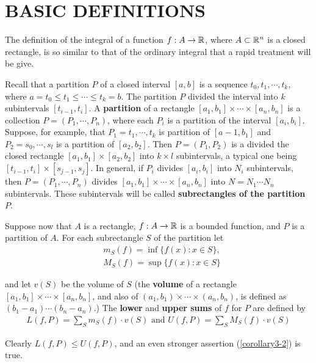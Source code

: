 \section{BASIC DEFINITIONS}
The definition of the integral of a function $f: A\to \mathbb{R}$, where $A\subset \mathbb{R}^n$
is a closed rectangle, is so similar to that of the ordinary integral that 
a rapid treatment will be give.

Recall that a partition $P$ of a closed interval $[a,b]$ is a
sequence $t_0, t_1, \cdots, t_k$, where $a=t_0\le t_1 \le \cdots \le t_k=b$.
The partition $P$ divided the interval into $k$ subintervals $[t_{i-1}, t_i]$.
A \textbf{partition} of a rectangle $[a_1, b_1]\times \cdots \times [a_n, b_n]$
is a collection $P=(P_1, \cdots, P_n)$, where each $P_i$ is a partition of the interval 
$[a_i, b_i]$. Suppose, for example, that $P_1=t_1,\cdots, t_k$ is partition of 
$[a-1, b_1]$ and $P_2=s_0, \cdots, s_l$ is a partition of $[a_2, b_2]$. Then 
$P=(P_1, P_2)$ is a divided the closed rectangle $[a_1, b_1]\times [a_2,b_2]$ into 
$k\times l$ subintervals, a typical one being $[t_{i-1}, t_i]\times [s_{j-1}, s_j]$.
In general, if $P_i$ divides $[a_i, b_i]$ into $N_i$ subintervals, then 
$P=(P_1, \cdots, P_n)$ divides $[a_1, b_1]\times \cdots \times [a_n, b_n]$ into 
$N = N_1 \cdots N_n$ subintervals. These subintervals will be called 
\textbf{subrectangles of the partition} $P$. 

Suppose now that $A$ is a rectangle, $f: A\to \mathbb{R}$ is a bounded function, and $P$ is a 
partition of $A$. For each subrectangle $S$ of the partition let
\begin{align*}
    & {m}_S(f) = \inf \{f(x):x\in S\},\\
    & {M}_S(f) = \sup \{f(x):x\in S\}
\end{align*}

and let $v(S)$ be the volume of $S$ (the \textbf{volume} of a rectangle 
$[a_1, b_1]\times \cdots\times [a_n, b_n]$, and also of $(a_1, b_1)\times \cdots\times (a_n, b_n)$,
is defined as $(b_1-a_1)\cdots (b_n-a_n)$.) The \textbf{lower} and \textbf{upper sums} of $f$ 
for $P$ are defined by
\begin{align*}
    L(f, P) 
    = \sum_{S }^{}{m_S(f)\cdot v(S)} \text{ and } 
    U(f, P) = \sum_{S}^{}{M_S(f)\cdot v(S)}
\end{align*}

Clearly $L(f, P)\le U(f, P)$, and an even stronger assertion (\ref{corollary3-2})
is true.

